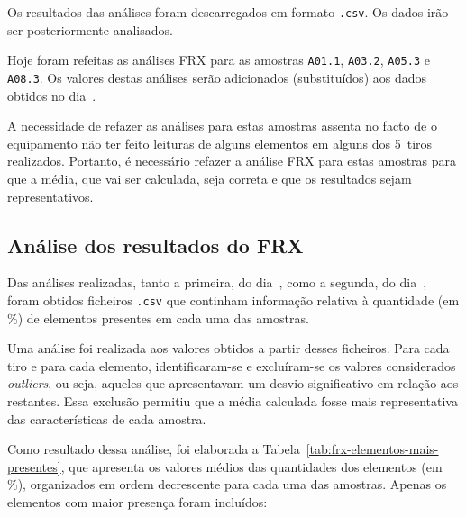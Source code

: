 Os resultados das análises foram descarregados em formato \texttt{.csv}.
Os dados irão ser posteriormente analisados.


\label{day:6-novembro-2024}

Hoje foram refeitas as análises FRX para as amostras \texttt{A01.1}, \texttt{A03.2}, \texttt{A05.3} e \texttt{A08.3}.
Os valores destas análises serão adicionados (substituídos) aos dados obtidos no dia~.

A necessidade de refazer as análises para estas amostras assenta no facto de o equipamento não ter feito leituras de alguns elementos em alguns dos 5~tiros realizados.
Portanto, é necessário refazer a análise FRX para estas amostras para que a média, que vai ser calculada, seja correta e que os resultados sejam representativos.

\hrulefill

\subsection*{Análise dos resultados do FRX}

Das análises realizadas, tanto a primeira, do dia~, como a segunda, do dia~, foram obtidos ficheiros \texttt{.csv} que continham informação relativa à quantidade (em \%) de elementos presentes em cada uma das amostras.

Uma análise foi realizada aos valores obtidos a partir desses ficheiros.
Para cada tiro e para cada elemento, identificaram-se e excluíram-se os valores considerados \emph{outliers}, ou seja, aqueles que apresentavam um desvio significativo em relação aos restantes.
Essa exclusão permitiu que a média calculada fosse mais representativa das características de cada amostra.

Como resultado dessa análise, foi elaborada a Tabela~\ref{tab:frx-elementos-mais-presentes}, que apresenta os valores médios das quantidades dos elementos (em \%), organizados em ordem decrescente para cada uma das amostras.
Apenas os elementos com maior presença foram incluídos:

